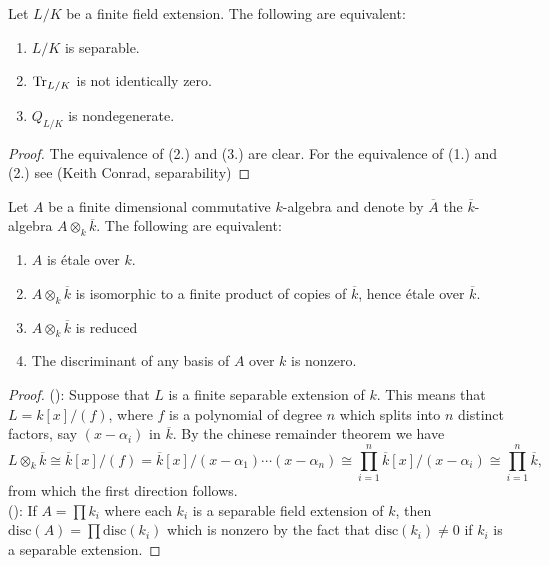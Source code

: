 \begin{lemma}
  Let $L/K$ be a finite field extension. The following are equivalent:
  \begin{enumerate}
    \item $L/K$ is separable.
    \item $\operatorname{Tr}_{L/K}$ is not identically zero.
    \item $Q_{L/K}$ is nondegenerate.
  \end{enumerate}
\end{lemma}

\begin{proof}
  The equivalence of (2.) and (3.) are clear. 
  For the equivalence of (1.) and (2.) see (Keith Conrad, separability)
\end{proof}

\begin{theorem}
  Let $A$ be a finite dimensional commutative $k$-algebra and denote by $\overline{A}$ the $\overline{k}$-algebra $A \otimes_k \overline{k}$. The following are equivalent:
  \begin{enumerate}
    \item $A$ is \'etale over $k$.\label{etale}
    \item $A \otimes_k \overline{k}$ is isomorphic to a finite product of copies of $\overline{k}$, hence \'etale over $\overline{k}$.\label{product}
    \item $A \otimes_k \overline{k}$ is reduced
    \item The discriminant of any basis of $A$ over $k$ is nonzero.\label{trace}
  \end{enumerate}
\end{theorem}

\begin{proof}
  ():
  Suppose that $L$ is a finite separable extension of $k$. This means that $L = k[x]/(f)$, where $f$ is a polynomial of degree $n$ which splits into $n$ distinct factors, say $(x-\alpha_i)$ in $\overline{k}$. By the chinese remainder theorem we have
  \[L \otimes_k \overline{k} \cong \overline{k}[x]/(f) = \overline{k}[x]/(x-\alpha_1)\cdots(x-\alpha_n) \cong \prod_{i=1}^n \overline{k}[x] / (x-\alpha_i) \cong \prod_{i=1}^n \overline{k},\] from which the first direction follows.\\
  ():
  If $A = \prod k_i$  where each $k_i$ is a separable field extension of $k$, then $\text{disc}(A) = \prod \text{disc}(k_i)$ which is nonzero by the fact that $\text{disc}(k_i) \neq 0$ if $k_i$ is a separable extension.
\end{proof}

